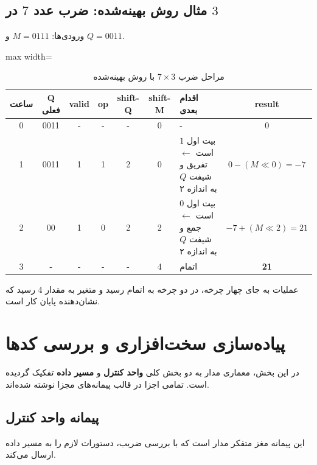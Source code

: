\documentclass[11pt,a4paper]{article}
\begin{document}
\subsection{مثال روش بهینه‌شده: ضرب عدد $7$ در $3$}
ورودی‌ها: $M = 0111$ و $Q = 0011$. 
\begin{table}[H]
    \centering
    \begin{adjustbox}{max width=\textwidth}
    \begin{tabular}{|c|c|c|c|c|c|l|c|}
        \hline
        \textbf{ساعت} & \textbf{Q فعلی} & \textbf{valid} & \textbf{op} & \textbf{shift-Q} & \textbf{shift-M} & \textbf{اقدام بعدی} & \textbf{result} \\
        \hline
        0 & 0011 & - & - & - & 0 & - & $0$ \\
        \hline
        1 & 0011 & 1 & 1 & 2 & 0 & بیت اول $1$ است $\leftarrow$ تفریق و شیفت $Q$ به اندازه ۲ & $0 - (M \ll 0) = -7$ \\
        \hline
        2 & 00 & 1 & 0 & 2 & 2 & بیت اول $0$ است $\leftarrow$ جمع و شیفت $Q$ به اندازه ۲ & $-7 + (M \ll 2) = 21$ \\
        \hline
        3 & - & - & - & - & 4 & اتمام & \textbf{21} \\
        \hline
    \end{tabular}
    \end{adjustbox}
    \caption{مراحل ضرب $7 \times 3$ با روش بهینه‌شده}
\end{table}
عملیات به جای چهار چرخه، در دو چرخه به اتمام رسید و متغیر  به مقدار $4$ رسید که نشان‌دهنده پایان کار است.

\newpage
\section{پیاده‌سازی سخت‌افزاری و بررسی کدها}
در این بخش، معماری مدار به دو بخش کلی \textbf{واحد کنترل} و \textbf{مسیر داده} تفکیک گردیده است. تمامی اجزا در قالب پیمانه‌های مجزا نوشته شده‌اند.

\subsection{پیمانه واحد کنترل}
این پیمانه مغز متفکر مدار است که با بررسی ضریب، دستورات لازم را به مسیر داده ارسال می‌کند.
\end{document}
